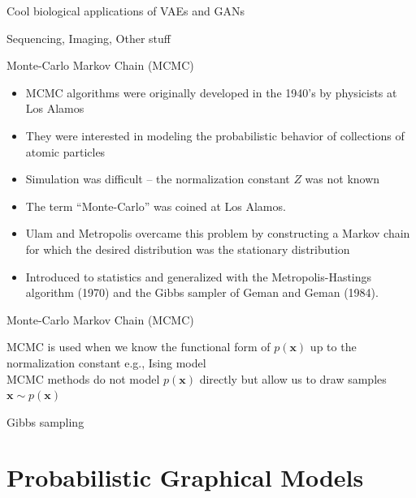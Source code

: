 \documentclass{beamer}					%
\begin{document}
\begin{frame}{Cool biological applications of VAEs and GANs}

Sequencing, Imaging, Other stuff

\end{frame}


\begin{frame}{Monte-Carlo Markov Chain (MCMC)}

\begin{itemize}

\item MCMC algorithms were originally developed in the 1940’s by physicists at
Los Alamos

\item They were interested in modeling the probabilistic behavior of collections of
atomic particles

\item Simulation was difficult – the normalization constant $Z$ was not known

\item The term “Monte-Carlo” was coined at Los Alamos.

\item Ulam and Metropolis overcame this problem by constructing a Markov chain
for which the desired distribution was the stationary distribution

\item Introduced to statistics and generalized with the Metropolis-Hastings
algorithm (1970) and the Gibbs sampler of Geman and Geman (1984).
\end{itemize}

\end{frame}

\begin{frame}{Monte-Carlo Markov Chain (MCMC)}

MCMC is used when we know the functional form of $p(\mathbf{x})$ up to the normalization constant e.g., Ising model\\
\vspace{0.1in}
MCMC methods do not model $p(\mathbf{x})$ directly but allow us to draw samples $\mathbf{x} \sim p(\mathbf{x})$

\end{frame}

\begin{frame}{Gibbs sampling}

\end{frame}


\section{Probabilistic Graphical Models}
\end{document}
